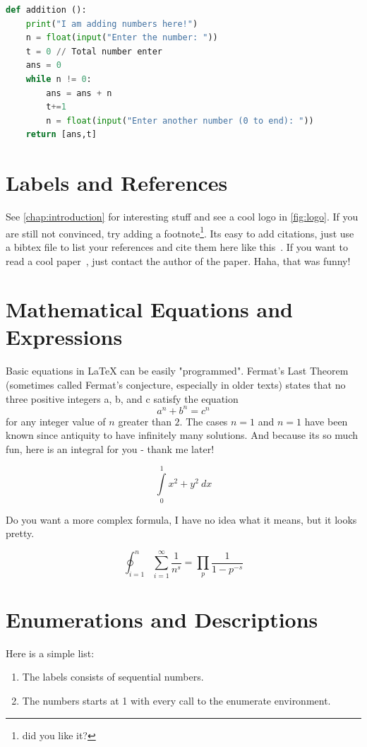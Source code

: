\documentclass{imc-inf}
\begin{document}
\begin{lstlisting}[language=Python]
def addition ():
    print("I am adding numbers here!")
    n = float(input("Enter the number: "))
    t = 0 // Total number enter
    ans = 0
    while n != 0:
        ans = ans + n
        t+=1
        n = float(input("Enter another number (0 to end): "))
    return [ans,t]
\end{lstlisting}

\section{Labels and References}
See \autoref{chap:introduction} for interesting stuff and see a cool logo in \autoref{fig:logo}. If you are still not convinced, try adding a footnote\footnote{did you like it?}. Its easy to add citations, just use a bibtex file to list your references and cite them here like this~\cite{988366}. If you want to read a cool paper~\cite{DBLP:conf/euromicro/DhunganaHW20}, just contact the author of the paper. Haha, that was funny! 




\section{Mathematical Equations and Expressions}
Basic equations in  \LaTeX{} can be easily "programmed". Fermat's Last Theorem (sometimes called Fermat's conjecture, especially in older texts) states that no three positive integers a, b, and c satisfy the equation \[ a^n + b^n = c^n \] for any integer value of $n$ greater than $2$. The cases $n = 1$ and  $n = 1$  have been known since antiquity to have infinitely many solutions. And because its so much fun, here is an integral for you - thank me later!  

\[ \int\limits_0^1 x^2 + y^2 \ dx \]

Do you want a more complex formula, I have no idea what it means, but it looks pretty. 

\[\oint_{i=1}^n \sum_{i=1}^{\infty} \frac{1}{n^s} 
= \prod_p \frac{1}{1 - p^{-s}} \]


\section{Enumerations and Descriptions}
Here is a simple list: 
\begin{enumerate}
	\item The labels consists of sequential numbers.
	\item The numbers starts at 1 with every call to the enumerate environment.
\end{enumerate}
\end{document}
